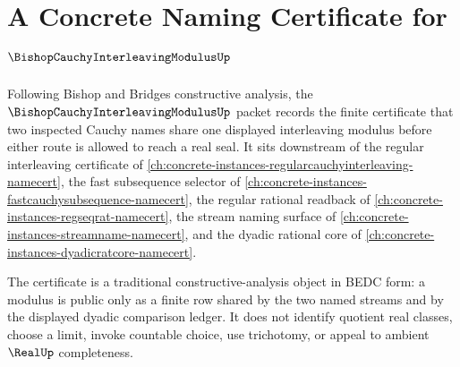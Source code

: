 \chapter{A Concrete Naming Certificate for $\BishopCauchyInterleavingModulusUp$}
\label{ch:concrete-instances-bishop-cauchy-interleaving-modulus-namecert}

Following Bishop and Bridges constructive analysis, the $\BishopCauchyInterleavingModulusUp$ packet records the finite certificate that two inspected Cauchy names share one displayed interleaving modulus before either route is allowed to reach a real seal. It sits downstream of the regular interleaving certificate of \autoref{ch:concrete-instances-regularcauchyinterleaving-namecert}, the fast subsequence selector of \autoref{ch:concrete-instances-fastcauchysubsequence-namecert}, the regular rational readback of \autoref{ch:concrete-instances-regseqrat-namecert}, the stream naming surface of \autoref{ch:concrete-instances-streamname-namecert}, and the dyadic rational core of \autoref{ch:concrete-instances-dyadicratcore-namecert}.

The certificate is a traditional constructive-analysis object in BEDC form: a modulus is public only as a finite row shared by the two named streams and by the displayed dyadic comparison ledger. It does not identify quotient real classes, choose a limit, invoke countable choice, use trichotomy, or appeal to ambient $\RealUp$ completeness.

